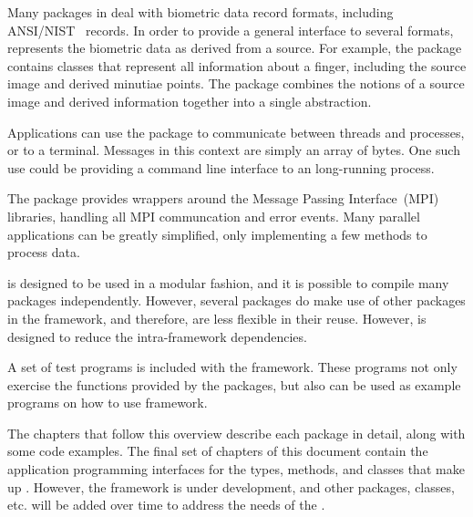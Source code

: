 Many packages in \sname deal with biometric data record formats, including
ANSI/NIST~\cite{std:an2k} records. In order to provide a general interface
to several formats, \sname represents the biometric data as derived from
a source. For example, the  package contains classes that represent
all information about a finger, including the source image and derived
minutiae points. The  package combines the notions of a source
image and derived information together into a single abstraction.

Applications can use the  package to communicate between
threads and processes, or to a terminal. Messages in this context are simply
an array of bytes. One such use could be providing a command line interface
to an long-running process.

The  package provides wrappers around the Message Passing
Interface~(MPI)~\cite{mpi} libraries, handling all MPI communcation and
error events. Many parallel applications can be greatly simplified, only
implementing a few methods to process data.

\sname is designed to be used in a modular fashion, and it is possible to
compile many packages independently. However, several packages do make use
of other packages in the framework, and therefore, are less flexible in their
reuse. However, \sname is designed to reduce the intra-framework
dependencies.

A set of test programs is included with the framework. These programs not only
exercise the functions provided by the packages, but also can be used as
example programs on how to use framework.

The chapters that follow this overview describe each package in detail,
along with some code examples.
The final set of chapters of this document contain the application programming
interfaces for the types, methods, and classes that make up \sname. However,
the framework is under development, and other packages, classes, etc. will be
added over time to address the needs of the \nistig.
